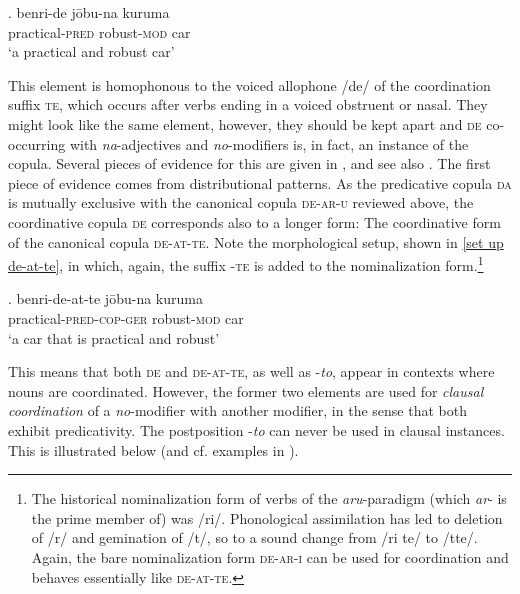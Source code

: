 \exg. benri-de jōbu-na kuruma\\
practical-\textsc{pred} robust-\textsc{mod} car\\
`a practical and robust car'

This element is homophonous to the voiced allophone /de/ of the coordination suffix \textsc{te}, which occurs after verbs ending in a voiced obstruent or nasal. They might look like the same element, however, they should be kept apart and \textsc{de} co-occurring with \textit{na}-adjectives and \textit{no}-modifiers is, in fact, an instance of the copula. Several pieces of evidence for this are given in \citet{hiraiwa:2012:mechanism}, and see also \citet{bloch:1970:bloch}. The first piece of evidence comes from distributional patterns. As the predicative copula \textsc{da} is mutually exclusive with the canonical copula \textsc{de-ar-u} reviewed above, the coordinative copula \textsc{de} corresponds also to a longer form: The coordinative form of the canonical copula \textsc{de-at-te}. Note the morphological setup, shown in \ref{set up de-at-te}, in which, again, the suffix -\textsc{te} is added to the nominalization form.\footnote{The historical nominalization form of verbs of the \textit{aru}-paradigm (which \textit{ar}- is the prime member of) was /ri/. Phonological assimilation has led to deletion of /r/ and gemination of /t/, so to a sound change from /ri te/ to /tte/. Again, the bare nominalization form \textsc{de-ar-i} can be used for coordination and behaves essentially like \textsc{de-at-te}.} 

\exg. benri-de-at-te jōbu-na kuruma\\
practical-\textsc{pred-cop-ger} robust-\textsc{mod} car\\
`a car that is practical and robust' \label{set up de-at-te}

This means that both \textsc{de} and \textsc{de-at-te}, as well as -\textit{to}, appear in contexts where nouns are coordinated. However, the former two elements are used for \textit{clausal coordination} of a \textit{no}-modifier with another modifier, in the sense that both exhibit predicativity. The postposition -\textit{to} can never be used in clausal instances. This is illustrated below (and cf. examples in \citealt[363]{hiraiwa:2012:mechanism}).  

